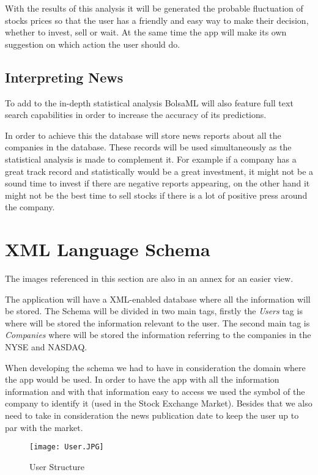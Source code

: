 \documentclass[twocolumn,twoside,11pt,a4paper]{article}
\begin{document}
With the results of this analysis it will be generated the probable fluctuation of stocks prices
so that the user has a friendly and easy way to make their decision, whether to invest, sell or wait.
At the same time the app will make its own suggestion on which action the user should do.


\subsection{Interpreting News}

To add to the in-depth statistical analysis BolsaML will also feature full text search capabilities
in order to increase the accuracy of its predictions.

In order to achieve this the database will store news reports about all the companies in the database.
These records will be used simultaneously as the statistical analysis is made to complement it.
For example if a company has a great track record and statistically would be a great investment,
it might not be a sound time to invest if there are negative reports appearing, on the other hand
it might not be the best time to sell stocks if there is a lot of positive press around the company.


\section{XML Language Schema}

The images referenced in this section are also in an annex for an easier view.

The application will have a XML-enabled database where all the information will be stored. The Schema will be divided in two main tags, firstly the \textit{Users} tag is where
will be stored the information relevant to the user. The second main tag is \textit{Companies}
where will be stored the information referring to the companies in the NYSE and NASDAQ.

When developing the schema we had to have in consideration the domain where the app would be used. In order to have the app with all the information information and with that information easy to access we used the symbol of the company to identify it (used in the Stock Exchange Market). Besides that we also need to take in consideration the news publication date to keep the user up to par with the market.

\begin{figure}[ht!]
\centering
\texttt{[image: User.JPG]}
\caption{User Structure}
\label{fig:User}
\end{figure}
\end{document}
